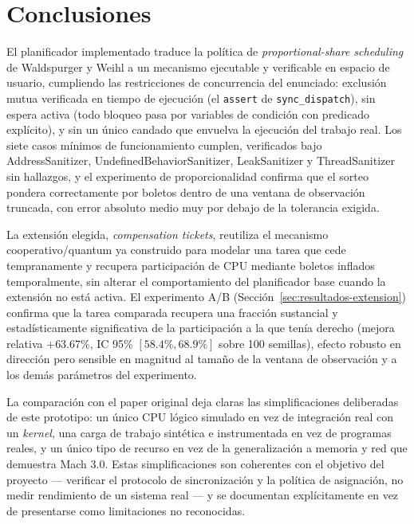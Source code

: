 \section{Conclusiones}

El planificador implementado traduce la política de \textit{proportional-share
scheduling} de Waldspurger y Weihl a un mecanismo ejecutable y verificable en
espacio de usuario, cumpliendo las restricciones de concurrencia del
enunciado: exclusión mutua verificada en tiempo de ejecución (el
\texttt{assert} de \texttt{sync\_dispatch}), sin espera activa (todo bloqueo
pasa por variables de condición con predicado explícito), y sin un único
candado que envuelva la ejecución del trabajo real. Los siete casos mínimos
de funcionamiento cumplen, verificados bajo AddressSanitizer,
UndefinedBehaviorSanitizer, LeakSanitizer y ThreadSanitizer sin hallazgos, y
el experimento de proporcionalidad confirma que el sorteo pondera
correctamente por boletos dentro de una ventana de observación truncada,
con error absoluto medio muy por debajo de la tolerancia exigida.

La extensión elegida, \textit{compensation tickets}, reutiliza el mecanismo
cooperativo/quantum ya construido para modelar una tarea que cede
tempranamente y recupera participación de CPU mediante boletos inflados
temporalmente, sin alterar el comportamiento del planificador base cuando la
extensión no está activa. El experimento A/B (Sección~\ref{sec:resultados-extension})
confirma que la tarea comparada recupera una fracción sustancial y
estadísticamente significativa de la participación a la que tenía derecho
(mejora relativa $+63.67\%$, IC 95\% $[58.4\%, 68.9\%]$ sobre 100 semillas),
efecto robusto en dirección pero sensible en magnitud al tamaño de la
ventana de observación y a los demás parámetros del experimento.

La comparación con el paper original deja claras las simplificaciones
deliberadas de este prototipo: un único CPU lógico simulado en vez de
integración real con un \textit{kernel}, una carga de trabajo sintética e
instrumentada en vez de programas reales, y un único tipo de recurso en vez
de la generalización a memoria y red que demuestra Mach 3.0. Estas
simplificaciones son coherentes con el objetivo del proyecto --- verificar
el protocolo de sincronización y la política de asignación, no medir
rendimiento de un sistema real --- y se documentan explícitamente en vez de
presentarse como limitaciones no reconocidas.
